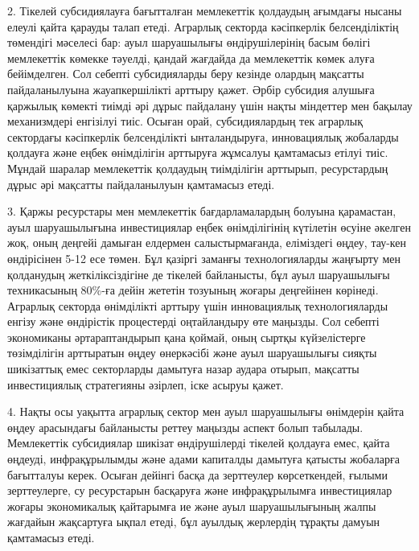 \begin{multicols}{2}
2. Тікелей субсидиялауға бағытталған мемлекеттік қолдаудың ағымдағы
нысаны елеулі қайта қарауды талап етеді. Аграрлық секторда кәсіпкерлік
белсенділіктің төмендігі мәселесі бар: ауыл шаруашылығы өндірушілерінің
басым бөлігі мемлекеттік көмекке тәуелді, қандай жағдайда да мемлекеттік
көмек алуға бейімделген. Сол себепті субсидияларды беру кезінде олардың
мақсатты пайдаланылуына жауапкершілікті арттыру қажет. Әрбір субсидия
алушыға қаржылық көмекті тиімді әрі дұрыс пайдалану үшін нақты міндеттер
мен бақылау механизмдері енгізілуі тиіс. Осыған орай, субсидиялардың тек
аграрлық сектордағы кәсіпкерлік белсенділікті ынталандыруға,
инновациялық жобаларды қолдауға және еңбек өнімділігін арттыруға
жұмсалуы қамтамасыз етілуі тиіс. Мұндай шаралар мемлекеттік қолдаудың
тиімділігін арттырып, ресурстардың дұрыс әрі мақсатты пайдаланылуын
қамтамасыз етеді.

3. Қаржы ресурстары мен мемлекеттік бағдарламалардың болуына қарамастан,
ауыл шаруашылығына инвестициялар еңбек өнімділігінің күтілетін өсуіне
әкелген жоқ, оның деңгейі дамыған елдермен салыстырмағанда, еліміздегі
өңдеу, тау-кен өндірісінен 5-12 есе төмен. Бұл қазіргі заманғы
технологияларды жаңғырту мен қолданудың жеткіліксіздігіне де тікелей
байланысты, бұл ауыл шаруашылығы техникасының 80\%-ға дейін жететін
тозуының жоғары деңгейінен көрінеді. Аграрлық секторда өнімділікті
арттыру үшін инновациялық технологияларды енгізу және өндірістік
процестерді оңтайландыру өте маңызды. Сол себепті экономиканы
әртараптандырып қана қоймай, оның сыртқы күйзелістерге төзімділігін
арттыратын өңдеу өнеркәсібі және ауыл шаруашылығы сияқты шикізаттық емес
секторларды дамытуға назар аудара отырып, мақсатты инвестициялық
стратегияны әзірлеп, іске асыруы қажет.

4. Нақты осы уақытта аграрлық сектор мен ауыл шаруашылығы өнімдерін
қайта өңдеу арасындағы байланысты реттеу маңызды аспект болып табылады.
Мемлекеттік субсидиялар шикізат өндірушілерді тікелей қолдауға емес,
қайта өңдеуді, инфрақұрылымды және адами капиталды дамытуға қатысты
жобаларға бағытталуы керек. Осыған дейінгі басқа да зерттеулер
көрсеткендей, ғылыми зерттеулерге, су ресурстарын басқаруға және
инфрақұрылымға инвестициялар жоғары экономикалық қайтарымға ие және ауыл
шаруашылығының жалпы жағдайын жақсартуға ықпал етеді, бұл ауылдық
жерлердің тұрақты дамуын қамтамасыз етеді.


\end{multicols}
